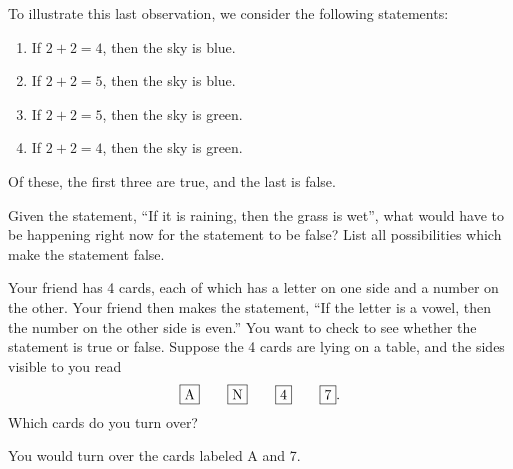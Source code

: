 \documentclass{tufte-book}
\begin{document}
To illustrate this last observation, we consider the following statements:
\begin{enumerate}
    \item If $2 + 2 = 4$, then the sky is blue.
    \item If $2 + 2 = 5$, then the sky is blue.
    \item If $2 + 2 = 5$, then the sky is green.
    \item If $2 + 2 = 4$, then the sky is green.
\end{enumerate}
Of these, the first three are true, and the last is false.
\begin{example}
  Given the statement, ``If it is raining, then the grass is wet'', what would have to be happening right now for the statement to be false? List all possibilities which make the statement false.
\end{example}

\begin{example}
  Your friend has 4 cards, each of which has a letter on one side and a number on the other. Your friend then makes the statement, ``If the letter is a vowel, then the number on the other side is even.'' You want to check to see whether the statement is true or false. Suppose the 4 cards are lying on a table, and the sides visible to you read
  \[
  \framebox{A} \qquad \framebox{N} \qquad \framebox{4} \qquad \framebox{7}.
  \]
  Which cards do you turn over? 
\end{example}

\begin{claim}
  You would turn over the cards labeled A and 7.
\end{claim}
\end{document}
